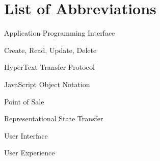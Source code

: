 \chapter*{List of Abbreviations}

\begin{description}[leftmargin=3cm,labelwidth=2.5cm]
    \item[API] Application Programming Interface
    \item[CRUD] Create, Read, Update, Delete
    \item[HTTP] HyperText Transfer Protocol
    \item[JSON] JavaScript Object Notation
    \item[POS] Point of Sale
    \item[REST] Representational State Transfer
    \item[UI] User Interface
    \item[UX] User Experience
\end{description}